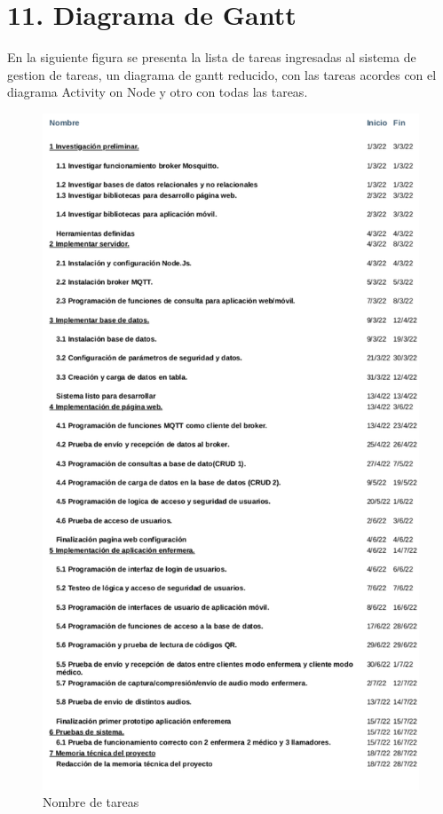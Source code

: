 \documentclass[
11pt, %
]{charter}
\begin{document}
\section{11. Diagrama de Gantt}
\label{sec:gantt}
En la siguiente figura se presenta la lista de tareas ingresadas al sistema de gestion de tareas, un diagrama de gantt reducido, con las tareas acordes con el diagrama Activity on Node y otro con todas las tareas.

\begin{figure}
\centering 
\includegraphics[height=.85\textheight]{./Figuras/Tareas-desc.pdf}
\caption{Nombre de tareas}
\label{fig:diagGantt0}
\end{figure}
\end{document}
